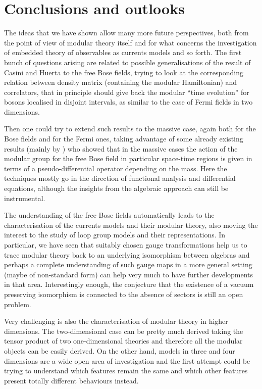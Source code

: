 \chapter*{Conclusions and outlooks}
\label{conclusions}
The ideas that we have shown allow many more future 
perspectives, both from the point of view of modular 
theory itself and for what concerns the investigation
of embedded theory of observables as currents models
and so forth. The first bunch of questions arising 
are related to possible generalisations of the result 
of Casini and Huerta to the free Bose fields, trying to
look at the corresponding relation between density matrix
(containing the modular Hamiltonian) and correlators, that
in principle should give back the modular ``time evolution'' 
for bosons localised in 
disjoint intervals, as similar to
the case of Fermi fields in two dimensions.

Then one could try to extend such results to the massive
case, again both for the Bose fields and for the Fermi ones,
taking advantage of some already existing results 
(mainly by \cite{FigGui:1989, Saf:2006}) who showed that
in the massive cases the action of the modular group 
for the free Bose field in particular space-time regions
is given in terms of a pseudo-differential operator 
depending on the mass. Here the techniques mostly go in the
direction of functional analysis and differential equations,
although the insights from the algebraic approach can still
be instrumental.

\bigskip 
The understanding of the free Bose fields automatically
leads to the characterisation of the currents models and
their modular theory, also moving the interest to the 
study of loop group models and their representations. 
In particular, we have seen that suitably chosen gauge 
transformations help us to trace modular theory back to
an underlying isomorphism between algebras and perhaps
a complete understanding of such gauge maps in a more
general setting (maybe of non-standard form) 
can help very much to have further developments in
that area. Interestingly enough, the conjecture that the 
existence of a vacuum preserving isomorphism is connected to
the absence of sectors is still an open problem.

\bigskip 
Very challenging is also the characterisation of modular 
theory in higher dimensions. The two-dimensional case can be
pretty much derived taking the tensor product of two one-dimensional
theories and therefore all the modular objects can be easily
derived. On the other hand, models in three and four dimensions
are a wide open area of investigation and the first attempt
could be trying to understand which features remain the same and
which other features present totally different behaviours instead.



